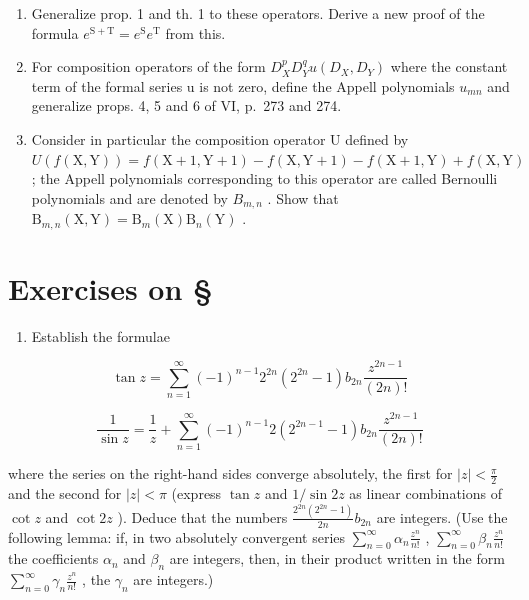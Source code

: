 \begin{enumerate}
\def\labelenumi{\alph{enumi})}
\item
  Generalize prop. 1 and th. 1 to these operators. Derive a new proof of the formula \(e^{\mathrm{S + T}} = e^{\mathrm{S}}e^{\mathrm{T}}\) from this.
\item
  For composition operators of the form \(D_{X}^{p}D_{Y}^{q}u(D_{X},D_{Y})\) where the constant term of the formal series u is not zero, define the Appell polynomials \(u_{mn}\) and generalize props. 4, 5 and 6 of VI, p.~273 and 274.
\item
  Consider in particular the composition operator U defined by \(U(f(\mathrm{X},\mathrm{Y})) = f(\mathrm{X} + 1, \mathrm{Y} + 1) - f(\mathrm{X},\mathrm{Y} + 1) - f(\mathrm{X} + 1, \mathrm{Y}) + f(\mathrm{X},\mathrm{Y})\) ; the Appell polynomials corresponding to this operator are called Bernoulli polynomials and are denoted by \(B_{m,n}\) . Show that \(\mathrm{B}_{m,n}(\mathrm{X},\mathrm{Y}) = \mathrm{B}_{m}(\mathrm{X})\mathrm{B}_{n}(\mathrm{Y})\) .
\end{enumerate}

\setcounter{exercisegroup}{1}
\section*{Exercises on \S{}}
{}

\begin{enumerate}
\def\labelenumi{\arabic{enumi})}
\tightlist
\item
  Establish the formulae
\end{enumerate}

\[
\tan z = \sum_ {n = 1} ^ {\infty} (- 1) ^ {n - 1} 2 ^ {2 n} (2 ^ {2 n} - 1) b _ {2 n} \frac {z ^ {2 n - 1}}{(2 n) !}
\]

\[
\frac {1}{\sin z} = \frac {1}{z} + \sum_ {n = 1} ^ {\infty} (- 1) ^ {n - 1} 2 (2 ^ {2 n - 1} - 1) b _ {2 n} \frac {z ^ {2 n - 1}}{(2 n) !}
\]

where the series on the right-hand sides converge absolutely, the first for \(|z| < \frac{\pi}{2}\) and the second for \(|z| < \pi\) (express \(\tan z\) and \(1/\sin 2z\) as linear combinations of \(\cot z\) and \(\cot 2z\) ). Deduce that the numbers \(\frac{2^{2n}(2^{2n}-1)}{2n} b_{2n}\) are integers. (Use the following lemma: if, in two absolutely convergent series \(\sum_{n=0}^{\infty} \alpha_n \frac{z^n}{n!}\) , \(\sum_{n=0}^{\infty} \beta_n \frac{z^n}{n!}\) the coefficients \(\alpha_n\) and \(\beta_n\) are integers, then, in their product written in the form \(\sum_{n=0}^{\infty} \gamma_n \frac{z^n}{n!}\) , the \(\gamma_n\) are integers.)

